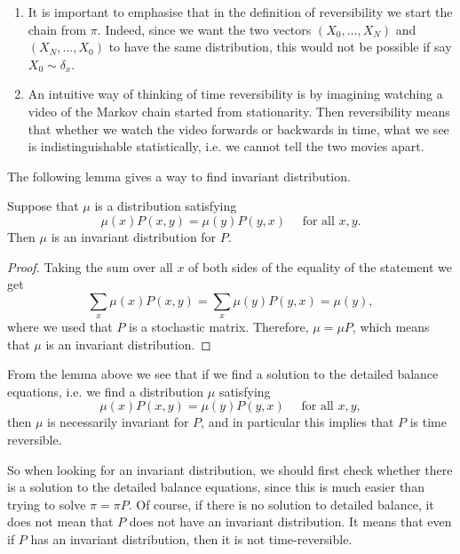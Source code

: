 \documentclass[a4paper,11pt]{article}
\begin{document}
\begin{remark}
    \begin{enumerate}
        \item It is important to emphasise that in the definition of reversibility we start the chain from $\pi$. Indeed, since we want the two vectors $\left(X_0, \ldots, X_N\right)$ and $\left(X_N, \ldots, X_0\right)$ to have the same distribution, this would not be possible if say $X_0 \sim \delta_x$.

        \item An intuitive way of thinking of time reversibility is by imagining watching a video of the Markov chain started from stationarity. Then reversibility means that whether we watch the video forwards or backwards in time, what we see is indistinguishable statistically, i.e. we cannot tell the two movies apart.
    \end{enumerate}
\end{remark}

The following lemma gives a way to find invariant distribution. 

\begin{lemma}
    Suppose that $\mu$ is a distribution satisfying
    \[
    \mu(x) P(x, y)=\mu(y) P(y, x) \quad \text { for all } x, y .
    \]
    Then $\mu$ is an invariant distribution for $P$.
\end{lemma}
\begin{proof}
    Taking the sum over all $x$ of both sides of the equality of the statement we get
    \[
    \sum_x \mu(x) P(x, y)=\sum_x \mu(y) P(y, x)=\mu(y),
    \]
    where we used that $P$ is a stochastic matrix. Therefore, $\mu=\mu P$, which means that $\mu$ is an invariant distribution.
\end{proof}

\begin{remark}
    From the lemma above we see that if we find a solution to the detailed balance equations, i.e. we find a distribution $\mu$ satisfying
    \[
    \mu(x) P(x, y)=\mu(y) P(y, x) \quad \text { for all } x, y,
    \]
    then $\mu$ is necessarily invariant for $P$, and in particular this implies that $P$ is time reversible. 
    
    So when looking for an invariant distribution, we should first check whether there is a solution to the detailed balance equations, since this is much easier than trying to solve $\pi=\pi P$. Of course, if there is no solution to detailed balance, it does not mean that $P$ does not have an invariant distribution. It means that even if $P$ has an invariant distribution, then it is not time-reversible.
\end{remark}
\end{document}
